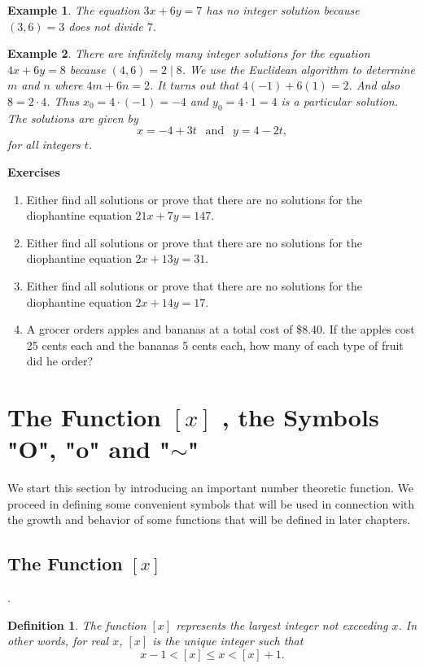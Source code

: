 \documentclass[12pt,letterpaper]{book}
\newtheorem{definition}{Definition}
\newtheorem{example}{Example}
\begin{document}
\begin{example}
The equation $3x+6y=7$ has no integer solution because $(3,6)=3$
does not divide $7$.
\end{example}

\begin{example}
There are infinitely many integer solutions for the equation\\
$4x+6y=8$ because $(4,6)=2 \mid 8$.  We use the Euclidean algorithm
to determine $m$ and $n$ where $4m+6n=2$.  It turns out that
$4(-1)+6(1)=2$. And also $8=2\cdot4$. Thus $x_0=4\cdot(-1)=-4$ and
$y_0=4\cdot1=4$ is a particular solution. The solutions are given by
\begin{equation*}
x=-4+3t \ \ \text{~and~} \ \  y=4-2t,
\end{equation*}
for all integers $t$.
\end{example}

\textbf{Exercises}
\begin{enumerate}
\item{Either find all solutions or prove that there are no
solutions for the diophantine equation $21x+7y=147.$}\item{Either
find all solutions or prove that there are no solutions for the
diophantine equation $2x+13y=31.$}\item{Either find all solutions or
prove that there are no solutions for the diophantine equation
$2x+14y=17.$}\item{A grocer orders apples and bananas at a total
cost of \$8.40.  If the apples cost 25 cents each and the bananas 5
cents each, how many of each type of fruit did he order?}
\end{enumerate}

\newpage

\section{The Function $[x]$ , the Symbols "O", "o" and  "$\sim$"}
We start this section by introducing an important number theoretic
function.  We proceed in defining some convenient symbols that will
be used in connection with the growth and behavior
of some functions that will be defined in later chapters.  \\


\subsection{The Function $[x]$}. 
\begin{definition}
The function $[x]$ represents the largest integer not exceeding $x$.
In other words, for real $x$, $[x]$ is the unique integer such that
\begin{equation*}
x-1<[x]\leq x<[x]+1.
\end{equation*}
\end{definition}
\end{document}
